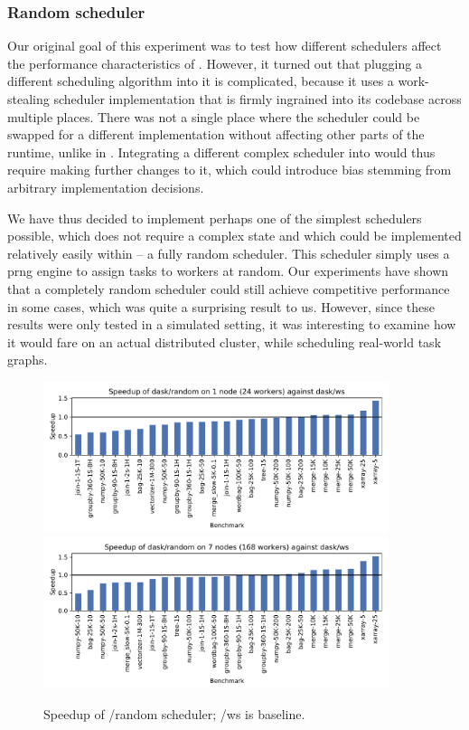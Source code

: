 \subsubsection*{Random scheduler}
Our original goal of this experiment was to test how different schedulers affect the performance
characteristics of \dask{}. However, it turned out that plugging a different
scheduling algorithm into it is complicated, because it uses a work-stealing scheduler
implementation that is firmly ingrained into its codebase across multiple places. There was not a
single place where the scheduler could be swapped for a different implementation without affecting
other parts of the runtime, unlike in \estee{}. Integrating a different complex
scheduler into \dask{} would thus require making further changes to it, which
could introduce bias stemming from arbitrary implementation decisions.

We have thus decided to implement perhaps one of the simplest schedulers possible, which does not
require a complex state and which could be implemented relatively easily within
\dask{} -- a fully random scheduler. This scheduler simply uses a
\gls{prng} engine to assign tasks to workers at random. Our
\estee{} experiments have shown that a completely random scheduler could still
achieve competitive performance in some cases, which was quite a surprising result to us. However,
since these results were only tested in a simulated setting, it was interesting to examine how it
would fare on an actual distributed cluster, while scheduling real-world
\dask{} task graphs.

\begin{figure}
	\centering
	\includegraphics[width=0.9\textwidth]{imgs/rsds/charts/speedup-dask-random-1}
	\includegraphics[width=0.9\textwidth]{imgs/rsds/charts/speedup-dask-random-7}
	\caption{Speedup of \dask{}/random scheduler; \dask{}/ws is baseline.}
	\label{fig:dask-ws-vs-random}
\end{figure}

